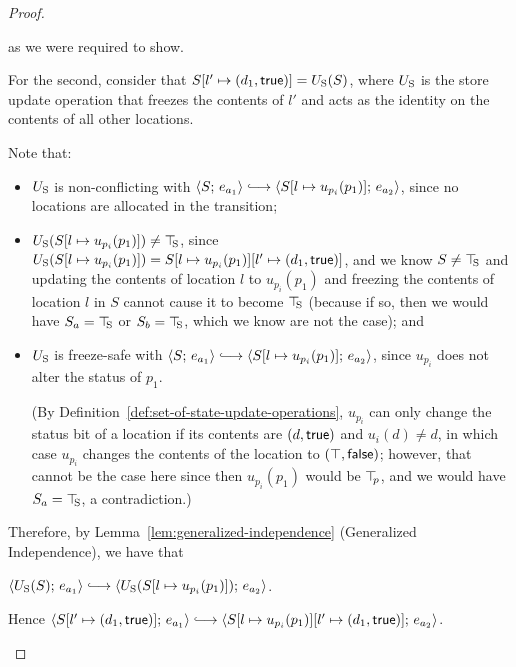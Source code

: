 \begin{proof}
\begin{enumerate}
\begin{enumerate}
\begin{itemize}
        as we were required to show.

        For the second, consider that
        $S[l' \mapsto (d_1, \textsf{true})] = U_{\mathrm{S}}(S)$, where $U_{\mathrm{S}}$ is
        the store update operation that freezes the contents of $l'$
        and acts as the identity on the contents of all other
        locations.

        Note that:
        \begin{itemize}
        \item $U_{\mathrm{S}}$ is non-conflicting with $\config{S}{e_{a_1}}
          \parstepsto
          \config{\extSRaw{S}{l}{u_{p_i}(p_1)}}{e_{a_2}}$, since no
          locations are allocated in the transition;
        \item $U_{\mathrm{S}}(S[l \mapsto u_{p_i}(p_1)]) \neq \top\hspace{-0.85mm}_{\mathrm{S}}$, since
          $U_{\mathrm{S}}(S[l \mapsto u_{p_i}(p_1)]) =
          S[l \mapsto u_{p_i}(p_1)][l' \mapsto (d_1, \textsf{true})]$,
          and we know $S \neq \top\hspace{-0.85mm}_{\mathrm{S}}$ and updating the contents of
          location $l$ to $u_{p_i}(p_1)$ and freezing the contents
          of location $l$ in $S$ cannot cause it to become $\top\hspace{-0.85mm}_{\mathrm{S}}$
          (because if so, then we would have $S_a = \top\hspace{-0.85mm}_{\mathrm{S}}$ or $S_b =
          \top\hspace{-0.85mm}_{\mathrm{S}}$, which we know are not the case); and
        \item $U_{\mathrm{S}}$ is freeze-safe with $\config{S}{e_{a_1}}
          \parstepsto
          \config{\extSRaw{S}{l}{u_{p_i}(p_1)}}{e_{a_2}}$, since
          $u_{p_i}$ does not alter the status of $p_1$.

          (By Definition~\ref{def:set-of-state-update-operations},
          $u_{p_i}$ can only change the status bit of a location if
          its contents are $(d, \textsf{true})$ and $u_i(d) \neq
          d$, in which case $u_{p_i}$ changes the contents of the
          location to $(\top, \textsf{false})$; however, that
          cannot be the case here since then $u_{p_i}(p_1)$ would be
          $\top\hspace{-0.85mm}_{p}$, and we would have $S_a = \top\hspace{-0.85mm}_{\mathrm{S}}$, a contradiction.)
        \end{itemize}
        Therefore, by Lemma~\ref{lem:generalized-independence}
        (Generalized Independence), we have that

        $\config{\Ustore(S)}{e_{a_1}} \parstepsto
        \config{\Ustore(\extSRaw{S}{l}{u_{p_i}(p_1)})}{e_{a_2}}$.

        Hence $\config{\extS{S}{l'}{d_1}{\frozentrue}}{e_{a_1}}
        \parstepsto
        \config{\extS{\extSRaw{S}{l}{u_{p_i}(p_1)}}{l'}{d_1}{\frozentrue}}{e_{a_2}}$.


\end{itemize}
\end{enumerate}
\end{enumerate}
\end{proof}
